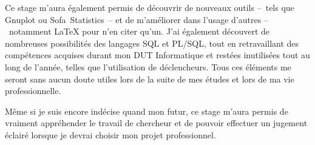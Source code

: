 	Ce stage m'aura également permis de découvrir de nouveaux outils --~tels que Gnuplot ou Sofa~Statistics~-- et de m'améliorer dans l'usage d'autres --~notamment \LaTeX{} pour n'en citer qu'un. J'ai également découvert de nombreuses possibilités des langages SQL et PL/SQL, tout en retravaillant des compétences acquises durant mon DUT Informatique et restées inutilisées tout au long de l'année, telles que l'utilisation de déclencheurs. Tous ces éléments me seront sans aucun doute utiles lors de la suite de mes études et lors de ma vie professionnelle.
	
	Même si je suis encore indécise quand mon futur, ce stage m'aura permis de vraiment appréhender le travail de chercheur et de pouvoir effectuer un jugement éclairé lorsque je devrai choisir mon projet professionnel.